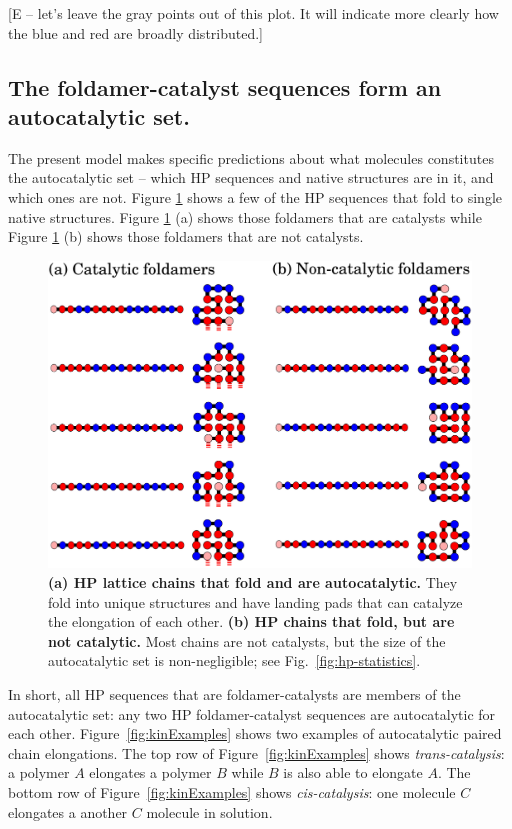 \documentclass[5p,times]{elsarticle}
\begin{document}
[E -- let's leave the gray points out of this plot.  It will indicate more clearly how the blue and 
red are broadly distributed.] 

\subsection{The foldamer-catalyst sequences form an autocatalytic set.}

 The present model makes specific predictions about what molecules constitutes the autocatalytic 
set -- which HP sequences and native structures are in it, and which ones are not.  Figure 
\ref{fig:fold-cat} shows a few of the HP sequences that fold to single native structures.  Figure 
\ref{fig:fold-cat} (a) shows those foldamers that are catalysts while Figure \ref{fig:fold-cat} (b) 
shows those foldamers that are not catalysts.  
 
\begin{figure}[htb!]
  \centering
  \includegraphics[width=\columnwidth]{pictures/fold-cat.pdf} 
  \caption{\footnotesize{\textbf{(a) HP lattice chains that fold and are autocatalytic.}  They fold 
into unique structures and have landing pads that can catalyze the elongation of each other.  
\textbf{(b) HP chains that fold, but are not catalytic.}  Most chains are not catalysts, but the 
size of the autocatalytic set is non-negligible; see Fig.~\ref{fig:hp-statistics}.}}
  \label{fig:fold-cat}
\end{figure}

 In short, all HP sequences that are foldamer-catalysts are members of the autocatalytic set: any 
two HP foldamer-catalyst sequences are autocatalytic for each other.  Figure~\ref{fig:kinExamples} 
shows two examples of autocatalytic paired chain elongations.  The top row of 
Figure~\ref{fig:kinExamples} shows \emph{trans-catalysis}: a polymer $A$ elongates a polymer $B$ 
while $B$ is also able to elongate $A$.  The bottom row of Figure~\ref{fig:kinExamples} shows 
\emph{cis-catalysis}: one molecule $C$ elongates a another $C$ molecule in solution.
\end{document}
